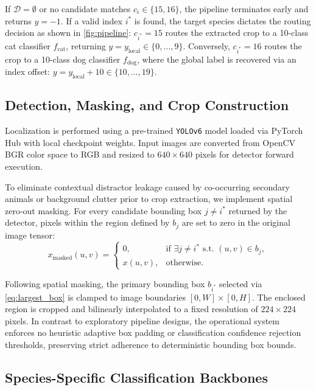 If $\mathcal{D} = \emptyset$ or no candidate matches $c_i \in \{15, 16\}$, the pipeline terminates early and returns $y = -1$. If a valid index $i^*$ is found, the target species dictates the routing decision as shown in \cref{fig:pipeline}: $c_{i^*} = 15$ routes the extracted crop to a 10-class cat classifier $f_{\text{cat}}$, returning $y = y_{\text{local}} \in \{0, \dots, 9\}$. Conversely, $c_{i^*} = 16$ routes the crop to a 10-class dog classifier $f_{\text{dog}}$, where the global label is recovered via an index offset: $y = y_{\text{local}} + 10 \in \{10, \dots, 19\}$.

\subsection{Detection, Masking, and Crop Construction}
\label{subsec:detection_masking}

Localization is performed using a pre-trained \texttt{YOLOv6} model \cite{li2022yolov6} loaded via PyTorch Hub with local checkpoint weights. Input images are converted from OpenCV BGR color space to RGB and resized to $640 \times 640$ pixels for detector forward execution. 

To eliminate contextual distractor leakage caused by co-occurring secondary animals or background clutter prior to crop extraction, we implement spatial zero-out masking. For every candidate bounding box $j \neq i^*$ returned by the detector, pixels within the region defined by $b_j$ are set to zero in the original image tensor:
\begin{equation}
  x_{\text{masked}}(u, v) = \begin{cases} 
  0, & \text{if } \exists j \neq i^* \text{ s.t. } (u, v) \in b_j, \\ 
  x(u, v), & \text{otherwise.} 
  \end{cases}
  \label{eq:masking}
\end{equation}

Following spatial masking, the primary bounding box $b_{i^*}$ selected via \cref{eq:largest_box} is clamped to image boundaries $[0, W] \times [0, H]$. The enclosed region is cropped and bilinearly interpolated to a fixed resolution of $224 \times 224$ pixels. In contrast to exploratory pipeline designs, the operational system enforces no heuristic adaptive box padding or classification confidence rejection thresholds, preserving strict adherence to deterministic bounding box bounds.

\subsection{Species-Specific Classification Backbones}
\label{subsec:species_classifiers}

